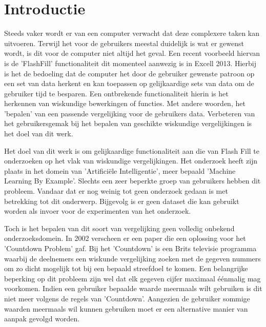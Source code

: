 \documentclass[Main.tex]{subfiles}
\begin{document}
\section{Introductie}
Steeds vaker wordt er van een computer verwacht dat deze complexere taken kan uitvoeren. Terwijl het voor de gebruikers meestal duidelijk is wat er gewenst wordt, is dit voor de computer niet altijd het geval. Een recent voorbeeld hiervan is de 'FlashFill' functionaliteit dit momenteel aanwezig is in Excell 2013. Hierbij is het de bedoeling dat de computer het door de gebruiker gewenste patroon op een set van data herkent en kan toepassen op gelijkaardige sets van data om de gebruiker tijd te besparen. Een ontbrekende functionaliteit hierin is het herkennen van wiskundige bewerkingen of functies. Met andere woorden, het 'bepalen' van een passende vergelijking voor de gebruikers data. Verbeteren van het gebruikersgemak bij het bepalen van geschikte wiskundige vergelijkingen is het doel van dit werk. \par  %

Het doel van dit werk is om gelijkaardige functionaliteit aan die van Flash Fill te onderzoeken op het vlak van wiskundige vergelijkingen. Het onderzoek heeft zijn plaats in het domein van 'Artifici\"ele Intelligentie', meer bepaald 'Machine Learning By Example'. Slechts een zeer beperkte groep van gebruikers hebben dit probleem. Vandaar dat er nog weinig tot geen onderzoek gedaan is met betrekking tot dit onderwerp. Bijgevolg is er geen dataset die kan gebruikt worden als invoer voor de experimenten van het onderzoek.  \par

Toch is het bepalen van dit soort van vergelijking geen volledig onbekend onderzoeksdomein. In 2002 verscheen er een paper die een oplossing voor het 'Countdown Problem' gaf. Bij het 'Countdown' is een Brits televisie programma waarbij de deelnemers een wiskunde vergelijking zoeken met de gegeven nummers om zo dicht mogelijk tot bij een bepaald streefdoel te komen. Een belangrijke beperking op dit probleem zijn wel dat elk gegeven cijfer maximaal \'e\'enmalig mag voorkomen. Indien een gebruiker bepaalde waarde meermaals wilt gebruiken is dit niet meer volgens de regels van 'Countdown'. Aangezien de gebruiker sommige waarden meermaals wil kunnen gebruiken moet er een alternative manier van aanpak gevolgd worden.
\end{document}
